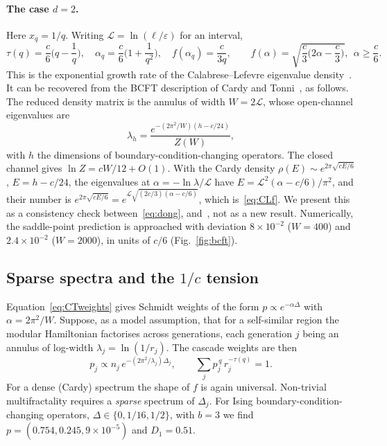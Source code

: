 \documentclass[11pt]{article}
\theoremstyle{definition}\newtheorem{definition}{Definition}[section]
\theoremstyle{remark}\newtheorem*{remark}{Remark}
\begin{document}
\paragraph{The case $d=2$.} Here $x_q=1/q$. Writing $\mathcal L=\ln(\ell/\varepsilon)$ for an interval,
\begin{equation}
\tau(q)=\frac c6\Big(q-\frac1q\Big),\quad \alpha_q=\frac c6\Big(1+\frac1{q^2}\Big),\quad
f(\alpha_q)=\frac{c}{3q},\qquad
f(\alpha)=\sqrt{\frac c3\Big(2\alpha-\frac c3\Big)},\ \ \alpha\ge\frac c6 .
\label{eq:CLf}
\end{equation}
This is the exponential growth rate of the Calabrese--Lefevre eigenvalue density~\cite{CL}. It can be
recovered from the BCFT description of Cardy and Tonni~\cite{CT}, as follows. The reduced density matrix is
the annulus of width $W=2\mathcal L$, whose open-channel eigenvalues are
\begin{equation}
\lambda_h=\frac{e^{-(2\pi^2/W)(h-c/24)}}{Z(W)},
\label{eq:CTweights}
\end{equation}
with $h$ the dimensions of boundary-condition-changing operators. The closed channel gives
$\ln Z=cW/12+O(1)$. With the Cardy density $\rho(E)\sim e^{2\pi\sqrt{cE/6}}$, $E=h-c/24$, the eigenvalues at
$\alpha=-\ln\lambda/\mathcal L$ have $E=\mathcal L^2(\alpha-c/6)/\pi^2$, and their number is
$e^{2\pi\sqrt{cE/6}}=e^{\mathcal L\sqrt{(2c/3)(\alpha-c/6)}}$, which is~\eqref{eq:CLf}. We present this as a
consistency check between~\eqref{eq:dong}, \cite{CT} and~\cite{CL}, not as a new result. Numerically, the
saddle-point prediction is approached with deviation $8\times10^{-2}$ ($W=400$) and $2.4\times10^{-2}$
($W=2000$), in units of $c/6$ (Fig.~\ref{fig:bcft}).

\subsection{Sparse spectra and the $1/c$ tension}
Equation~\eqref{eq:CTweights} gives Schmidt weights of the form $p\propto e^{-\alpha\Delta}$ with
$\alpha=2\pi^2/W$. Suppose, as a model assumption, that for a self-similar region the modular Hamiltonian
factorises across generations, each generation $j$ being an annulus of log-width $\lambda_j=\ln(1/r_j)$.
The cascade weights are then
\begin{equation}
p_j\propto n_j\,e^{-(2\pi^2/\lambda_j)\Delta_j},\qquad \sum_jp_j^{\,q}\,r_j^{-\tau(q)}=1 .
\end{equation}
For a dense (Cardy) spectrum the shape of $f$ is again universal. Non-trivial multifractality requires a
\emph{sparse} spectrum of $\Delta_j$. For Ising boundary-condition-changing operators,
$\Delta\in\{0,1/16,1/2\}$, with $b=3$ we find $p=(0.754,0.245,9\times10^{-5})$ and $D_1=0.51$.
\end{document}
